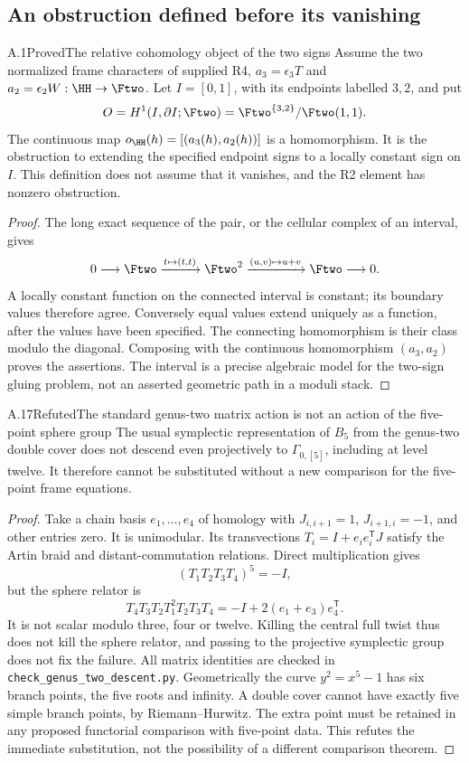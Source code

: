 \subsection{An obstruction defined before its vanishing}

\begin{statement}{A.1}{Proved}{The relative cohomology object of the two signs}
Assume the two normalized frame characters of supplied R4,
$a_3=\epsilon_3T$ and $a_2=\epsilon_2W:\HH\to\Ftwo$.
Let $I=[0,1]$, with its endpoints labelled $3,2$, and put
\[
 O=H^1(I,\partial I;\Ftwo)
   =\Ftwo^{\{3,2\}}/\Ftwo(1,1).
\]
The continuous map
$o_{\HH}(h)=[(a_3(h),a_2(h))]$ is a homomorphism.
It is the obstruction to extending the specified endpoint signs to a
locally constant sign on $I$. This definition does not assume that it
vanishes, and the R2 element has nonzero obstruction.
\end{statement}
\begin{proof}
The long exact sequence of the pair, or the cellular complex of an
interval, gives
\[
0\longrightarrow\Ftwo\xrightarrow{t\mapsto(t,t)}
\Ftwo^2\xrightarrow{(u,v)\mapsto u+v}\Ftwo\longrightarrow0.
\]
A locally constant function on the connected interval is constant;
its boundary values therefore agree. Conversely equal values extend
uniquely as a function, after the values have been specified. The
connecting homomorphism is their class modulo the diagonal. Composing
with the continuous homomorphism $(a_3,a_2)$ proves the assertions.
The interval is a precise algebraic model for the two-sign gluing
problem, not an asserted geometric path in a moduli stack.
\end{proof}

\begin{statement}{A.17}{Refuted}{The standard genus-two matrix action is not an action of the five-point sphere group}
The usual symplectic representation of $B_5$ from the genus-two
double cover does not descend even projectively to
$\Gamma_{0,[5]}$, including at level twelve. It therefore
cannot be substituted without a new comparison for the
five-point frame equations.
\end{statement}
\begin{proof}
Take a chain basis $e_1,\ldots,e_4$ of homology with
$J_{i,i+1}=1$, $J_{i+1,i}=-1$, and other entries zero.
It is unimodular. Its transvections
$T_i=I+e_i e_i^{\mathsf T}J$ satisfy the Artin braid
and distant-commutation relations. Direct multiplication gives
\[
 (T_1T_2T_3T_4)^5=-I,
\]
but the sphere relator is
\[
 T_4T_3T_2T_1^2T_2T_3T_4
 =-I+2(e_1+e_3)e_4^{\mathsf T}.
\]
It is not scalar modulo three, four or twelve. Killing
the central full twist thus does not kill the sphere
relator, and passing to the projective symplectic group
does not fix the failure. All matrix identities are
checked in \texttt{check\_genus\_two\_descent.py}.
Geometrically the curve $y^2=x^5-1$ has six branch
points, the five roots and infinity. A double cover
cannot have exactly five simple branch points, by
Riemann--Hurwitz. The extra point must be retained in
any proposed functorial comparison with five-point data.
This refutes the immediate substitution, not the
possibility of a different comparison theorem.
\end{proof}

